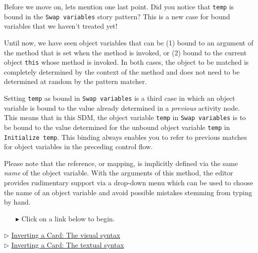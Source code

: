 Before we move on, lets mention one last point.  Did you notice that \texttt{temp} is bound in the \texttt{Swap variables} story pattern?  This is a new case
for bound variables that we haven't treated yet!

Until now, we have seen object variables that can be (1) bound to an argument of the method that is set when the method is invoked, or (2) bound to the current
object \texttt{this} whose method is invoked. In both cases, the object to be matched is completely determined by the context of the method and does not need to
be determined at random by the pattern matcher.

Setting \texttt{temp} as bound in \texttt{Swap variables} is a third case in which an object variable is bound to the value already determined in a
\emph{previous} activity node. This means that in this SDM, the object variable \texttt{temp} in \texttt{Swap variables} is to be bound to the value determined
for the unbound object variable \texttt{temp} in \texttt{Initialize temp}. This binding always enables you to refer to previous matches for object variables in the
preceding control flow. 

Please note that the reference, or mapping, is implicitly defined via the same \emph{name} of the object variable. With the arguments of this method, the editor
provides rudimentary support via a drop-down menu which can be used to choose the name of an object variable and avoid possible mistakes stemming from typing by
hand.

\vspace{1cm}
\begin{itemize}
\item[$\blacktriangleright$] Click on a link below to begin.
\end{itemize}

\begin{center}{$\triangleright$ \hyperlink{invertCard vis}{Inverting a Card: The visual syntax}}%
\\ \vspace{0.5cm}
{$\triangleright$ \hyperlink{invertCard tex}{Inverting a Card: The textual syntax}} \end{center} 





